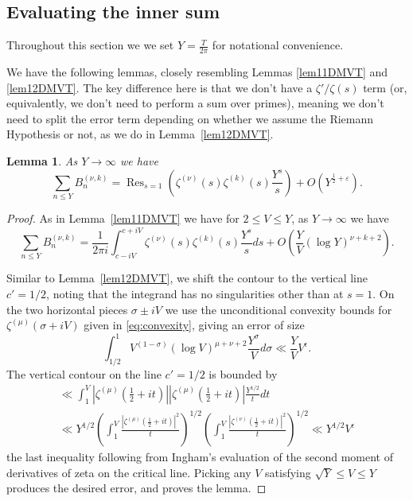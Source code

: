 \documentclass[12pt, a4paper,reqno]{amsart}
\DeclareMathOperator*{\res}{Res}
\newtheorem{lemma}{Lemma}
\theoremstyle{definition}
\numberwithin{equation}{section}
\begin{document}
\subsection{Evaluating the inner sum} \hfill 

Throughout this section we  we set $Y = \frac{T}{2\pi}$ for notational convenience.

We have the following lemmas, closely resembling Lemmas \ref{lem11DMVT} and \ref{lem12DMVT}. The key difference here is that we don't have a $\zeta'/\zeta(s)$ term (or, equivalently, we don't need to perform a sum over primes), meaning we don't need to split the error term depending on whether we assume the Riemann Hypothesis or not, as we do in Lemma~\ref{lem12DMVT}.
\begin{lemma}\label{residue} 
As $Y\to\infty$ we have
\begin{equation}\label{eqn: E2}
    \sum_{n\le Y}B_n^{(\nu,k)}=\res_{s=1}\left(\zeta^{(\nu)}(s)\zeta^{(k)}(s)\frac{Y^s}{s}\right) + O\left( Y^{\frac{1}{2}+\varepsilon}\right).
\end{equation}
\end{lemma}

\begin{proof}
As in Lemma~\ref{lem11DMVT} we have for  $2\le V\le Y$, as $Y\to\infty$ we have 
\begin{equation*}
\sum_{n\le Y}B_n^{(\nu,k)}=\frac{1}{2\pi i}\int_{c-iV}^{c+iV}\zeta^{(\nu)}(s)\zeta^{(k)}(s)\frac{Y^s}{s}ds+O \left( \frac{Y}{V}(\log Y)^{\nu+k+2} \right).
\end{equation*}


Similar to Lemma~\ref{lem12DMVT}, we shift the contour to the vertical line $c'=1/2$, noting that the integrand has no singularities other than at $s=1$. On the two horizontal pieces $\sigma \pm iV$ we use the unconditional convexity bounds for $\zeta^{(\mu)}(\sigma+iV)$ given in \eqref{eq:convexity}, giving an error of size
\[
\int_{1/2}^1 V^{(1-\sigma)} (\log V)^{\mu+\nu+2} \frac{Y^\sigma}{V} d\sigma \ll \frac{Y}{V} V^\epsilon .
\]
The vertical contour on the line $c'=1/2$ is bounded by
\begin{multline*}
\ll \int_1^V \left|\zeta^{(\mu)}(\tfrac12+it)\right| \left|\zeta^{(\mu)}(\tfrac12+it)\right| \frac{Y^{1/2}}{t} dt \\
\ll Y^{1/2} \left( \int_1^V \frac{\left|\zeta^{(\mu)}(\tfrac12+it)\right|^2 }{t} \right)^{1/2} \left( \int_1^V \frac{\left|\zeta^{(\nu)}(\tfrac12+it)\right|^2 }{t} \right)^{1/2} 
\ll Y^{1/2} V^{\epsilon}
\end{multline*}
the last inequality following from Ingham's \cite{Ing26} evaluation of the second moment of derivatives of zeta on the critical line. Picking any $V$ satisfying $\sqrt{Y}\leq V \leq Y$ produces the desired error, and proves the lemma.
\end{proof}
\end{document}
